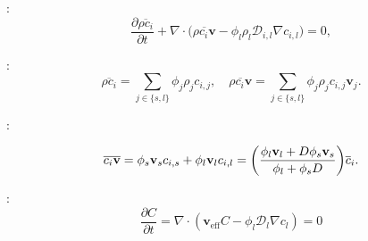 \documentclass[usenames,dvipsnames,letterpaper,landscape,final]{slides}
\begin{document}

\begin{myslide}

:
\begin{equation} \label{eq:specietransport}
		  \frac{\partial \overline{\rho c_{i}}}{\partial t} + \nabla \cdot \big( \overline{\rho c_{i} \mathbf{v}} - \phi_l \rho_l \mathcal{D}_{i,l} \nabla c_{i,l} \big) = 0,
\end{equation}

\vspace{20pt}

:
\begin{equation}
\overline{\rho c_i} = \sum_{j\in \{s,l\}} \phi_j \rho_j c_{i,j}, \quad 
\overline{\rho c_i \mathbf{v}} = \sum_{j\in \{s,l\}} \phi_j \rho_j c_{i,j} \mathbf{v}_j.
\end{equation}

:

\begin{equation}
\label{eq:effectivevel}
		  \overline{c_{i}\bold{v}} = \phi_s \bold{v}_s c_{i,s} + \phi_l \bold{v}_l c_{i,l} = 
		  \bigg( \frac{\phi_l \bold{v}_l + D\phi_s \bold{v}_s}{\phi_l + \phi_s D} \bigg) \overline{c}_i.
\end{equation}

\vspace{20pt}

:
\begin{equation}\label{eq:effectivetransportspecie}
		  \frac{\partial C}{\partial t} = 
		  \nabla \cdot (\mathbf{v}_{\text{eff}} C - \phi_l \mathcal{D}_l \nabla c_l)
		  = 0
\end{equation}

\end{myslide}
\end{document}
